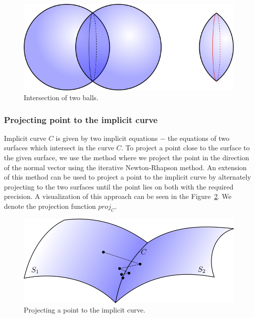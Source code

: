 \begin{figure}
    \centerline{\includegraphics[scale=0.5]{images/img35}}
    \caption[Intersection of a two balls]
    {Intersection of two balls.}
    \label{img:35}
\end{figure}

\subsubsection{Projecting point to the implicit curve}

Implicit curve $C$ is given by two implicit equations $-$ the equations of two surfaces
which intersect in the curve $C$.
To project a point close to the surface to the given surface, we use the method where
we project the point in the direction of the normal vector using the iterative 
Newton-Rhapson method. An extension of this method can be used to project a point
to the implicit curve by alternately projecting to the two surfaces until the
point lies on both with the required precision. A visualization of this approach can be
seen in the Figure~\ref{img:36}. We denote the projection function $proj_C$.

\begin{figure}
    \centerline{\includegraphics[scale=0.5]{images/img36}}
    \caption[Projecting a point to the implicit curve]
    {Projecting a point to the implicit curve.}
    \label{img:36}
\end{figure}

